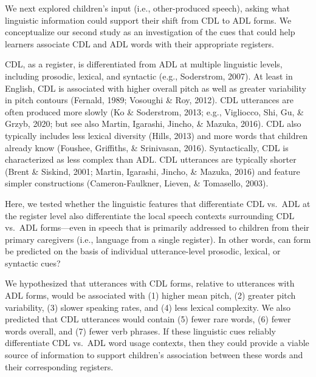 \documentclass[10pt, letterpaper]{article}
\begin{document}
We next explored children's input (i.e., other-produced speech), asking
what linguistic information could support their shift from CDL to ADL
forms. We conceptualize our second study as an investigation of the cues
that could help learners associate CDL and ADL words with their
appropriate registers.

CDL, as a register, is differentiated from ADL at multiple linguistic
levels, including prosodic, lexical, and syntactic (e.g., Soderstrom,
2007). At least in English, CDL is associated with higher overall pitch
as well as greater variability in pitch contours (Fernald, 1989;
Vosoughi \& Roy, 2012). CDL utterances are often produced more slowly
(Ko \& Soderstrom, 2013; e.g., Vigliocco, Shi, Gu, \& Grzyb, 2020; but
see also Martin, Igarashi, Jincho, \& Mazuka, 2016). CDL also typically
includes less lexical diversity (Hills, 2013) and more words that
children already know (Foushee, Griffiths, \& Srinivasan, 2016).
Syntactically, CDL is characterized as less complex than ADL. CDL
utterances are typically shorter (Brent \& Siskind, 2001; Martin,
Igarashi, Jincho, \& Mazuka, 2016) and feature simpler constructions
(Cameron-Faulkner, Lieven, \& Tomasello, 2003).

Here, we tested whether the linguistic features that differentiate CDL
vs.~ADL at the register level also differentiate the local speech
contexts surrounding CDL vs.~ADL forms---even in speech that is
primarily addressed to children from their primary caregivers (i.e.,
language from a single register). In other words, can form be predicted
on the basis of individual utterance-level prosodic, lexical, or
syntactic cues?

We hypothesized that utterances with CDL forms, relative to utterances
with ADL forms, would be associated with (1) higher mean pitch, (2)
greater pitch variability, (3) slower speaking rates, and (4) less
lexical complexity. We also predicted that CDL utterances would contain
(5) fewer rare words, (6) fewer words overall, and (7) fewer verb
phrases. If these linguistic cues reliably differentiate CDL vs.~ADL
word usage contexts, then they could provide a viable source of
information to support children's association between these words and
their corresponding registers.
\end{document}

